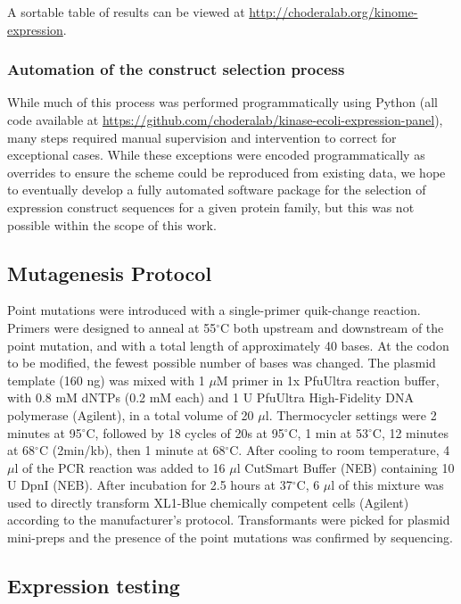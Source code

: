 \documentclass[9pt,lineno]{elife}
\begin{document}
A sortable table of results can be viewed at \url{http://choderalab.org/kinome-expression}.


\subsubsection{Automation of the construct selection process}

While much of this process was performed programmatically using Python (all code available at  \url{https://github.com/choderalab/kinase-ecoli-expression-panel}), many steps required manual supervision and intervention to correct for exceptional cases.
While these exceptions were encoded programmatically as overrides to ensure the scheme could be reproduced from existing data, we hope to eventually develop a fully automated software package for the selection of expression construct sequences for a given protein family, but this was not possible within the scope of this work.

\subsection{Mutagenesis Protocol}

Point mutations were introduced with a single-primer quik-change reaction. Primers were designed to anneal at 55$^{\circ}$C both upstream and downstream of the point mutation, and with a total length of approximately 40 bases. At the codon to be modified, the fewest possible number of bases was changed. The plasmid template (160 ng) was mixed with 1 $\mu$M primer in 1x PfuUltra reaction buffer, with 0.8 mM dNTPs (0.2 mM each) and 1 U PfuUltra High-Fidelity DNA polymerase (Agilent), in a total volume of 20 $\mu$l. Thermocycler settings were 2 minutes at 95$^{\circ}$C, followed by 18 cycles of 20s at 95$^{\circ}$C, 1 min at 53$^{\circ}$C, 12 minutes at 68$^{\circ}$C (2min/kb), then 1 minute at 68$^{\circ}$C. After cooling to room temperature, 4 $\mu$l of the PCR reaction was added to 16 $\mu$l CutSmart Buffer (NEB) containing 10 U DpnI (NEB). After incubation for 2.5 hours at 37$^{\circ}$C, 6 $\mu$l of this mixture was used to directly transform XL1-Blue chemically competent cells (Agilent) according to the manufacturer’s protocol. Transformants were picked for plasmid mini-preps and the presence of the point mutations was confirmed by sequencing.

\subsection{Expression testing}
\end{document}
